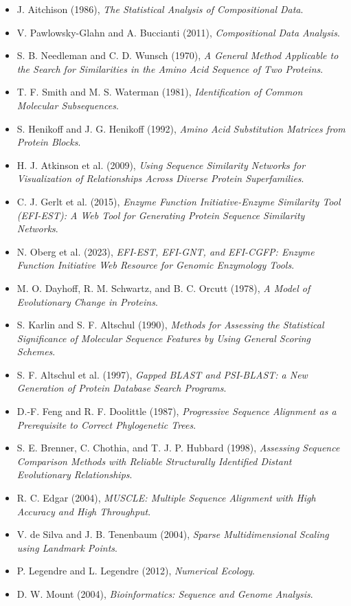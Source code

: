 \documentclass[11pt,a4paper]{article}
\begin{document}
\begin{itemize}[leftmargin=*]
\item J. Aitchison (1986), \emph{The Statistical Analysis of Compositional Data}.
\item V. Pawlowsky-Glahn and A. Buccianti (2011), \emph{Compositional Data Analysis}.
\item S. B. Needleman and C. D. Wunsch (1970), \emph{A General Method Applicable to the Search for Similarities in the Amino Acid Sequence of Two Proteins}.
\item T. F. Smith and M. S. Waterman (1981), \emph{Identification of Common Molecular Subsequences}.
\item S. Henikoff and J. G. Henikoff (1992), \emph{Amino Acid Substitution Matrices from Protein Blocks}.
\item H. J. Atkinson et al. (2009), \emph{Using Sequence Similarity Networks for Visualization of Relationships Across Diverse Protein Superfamilies}.
\item C. J. Gerlt et al. (2015), \emph{Enzyme Function Initiative-Enzyme Similarity Tool (EFI-EST): A Web Tool for Generating Protein Sequence Similarity Networks}.
\item N. Oberg et al. (2023), \emph{EFI-EST, EFI-GNT, and EFI-CGFP: Enzyme Function Initiative Web Resource for Genomic Enzymology Tools}.
\item M. O. Dayhoff, R. M. Schwartz, and B. C. Orcutt (1978), \emph{A Model of Evolutionary Change in Proteins}.
\item S. Karlin and S. F. Altschul (1990), \emph{Methods for Assessing the Statistical Significance of Molecular Sequence Features by Using General Scoring Schemes}.
\item S. F. Altschul et al. (1997), \emph{Gapped BLAST and PSI-BLAST: a New Generation of Protein Database Search Programs}.
\item D.-F. Feng and R. F. Doolittle (1987), \emph{Progressive Sequence Alignment as a Prerequisite to Correct Phylogenetic Trees}.
\item S. E. Brenner, C. Chothia, and T. J. P. Hubbard (1998), \emph{Assessing Sequence Comparison Methods with Reliable Structurally Identified Distant Evolutionary Relationships}.
\item R. C. Edgar (2004), \emph{MUSCLE: Multiple Sequence Alignment with High Accuracy and High Throughput}.
\item V. de Silva and J. B. Tenenbaum (2004), \emph{Sparse Multidimensional Scaling using Landmark Points}.
\item P. Legendre and L. Legendre (2012), \emph{Numerical Ecology}.
\item D. W. Mount (2004), \emph{Bioinformatics: Sequence and Genome Analysis}.
\end{itemize}
\end{document}

